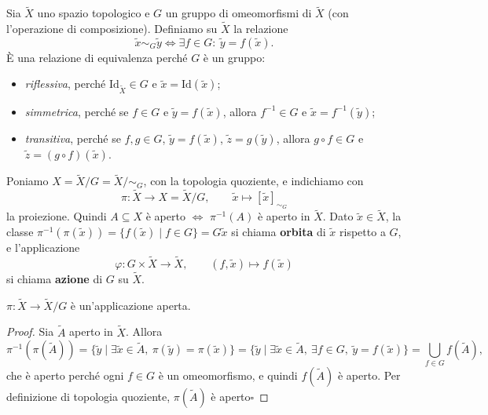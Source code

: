 Sia $\widetilde{X}$ uno spazio topologico e $G$ un gruppo di omeomorfismi di $\widetilde{X}$ (con l'operazione di composizione). Definiamo su $\widetilde{X}$ la relazione
\[
\widetilde{x} \sim_G \widetilde{y} \iff \exists f \in G : \ \widetilde{y} = f(\widetilde{x}).
\]
\`E una relazione di equivalenza perch\'e $G$ \`e un gruppo:
\begin{itemize}
    \item \emph{riflessiva}, perch\'e $\mathrm{Id}_{\widetilde{X}} \in G$ e $\widetilde{x} = \mathrm{Id}(\widetilde{x})$;
    \item \emph{simmetrica}, perch\'e se $f \in G$ e $\widetilde{y} = f(\widetilde{x})$, allora $f^{-1} \in G$ e $\widetilde{x} = f^{-1}(\widetilde{y})$;
    \item \emph{transitiva}, perch\'e se $f, g \in G$, $\widetilde{y} = f(\widetilde{x})$, $\widetilde{z} = g(\widetilde{y})$, allora $g \circ f \in G$ e $\widetilde{z} = (g \circ f)(\widetilde{x})$.
\end{itemize}
Poniamo $X = \widetilde{X}/G = \widetilde{X}/\!\sim_G$, con la topologia quoziente, e indichiamo con
\[
\pi: \widetilde{X} \to X = \widetilde{X}/G, \qquad \widetilde{x} \mapsto [\widetilde{x}]_{\sim_G}
\]
la proiezione. Quindi $A \subseteq X$ \`e aperto $\iff$ $\pi^{-1}(A)$ \`e aperto in $\widetilde{X}$.
Dato $\widetilde{x} \in \widetilde{X}$, la classe $\pi^{-1}(\pi(\widetilde{x})) = \{ f(\widetilde{x}) \mid f \in G \} = G\widetilde{x}$ si chiama \textbf{orbita} di $\widetilde{x}$ rispetto a $G$, e l'applicazione
\[
\varphi: G \times \widetilde{X} \to \widetilde{X}, \qquad (f, \widetilde{x}) \mapsto f(\widetilde{x})
\]
si chiama \textbf{azione} di $G$ su $\widetilde{X}$.

\begin{prop}
$\pi: \widetilde{X} \to \widetilde{X}/G$ \`e un'applicazione aperta.
\end{prop}
\begin{proof}
Sia $\widetilde{A}$ aperto in $\widetilde{X}$. Allora
\[
\pi^{-1}(\pi(\widetilde{A})) = \{ \widetilde{y} \mid \exists \widetilde{x} \in \widetilde{A},\ \pi(\widetilde{y}) = \pi(\widetilde{x}) \} = \{ \widetilde{y} \mid \exists \widetilde{x} \in \widetilde{A},\ \exists f \in G,\ \widetilde{y} = f(\widetilde{x}) \} = \bigcup_{f \in G} f(\widetilde{A}),
\]
che \`e aperto perch\'e ogni $f \in G$ \`e un omeomorfismo, e quindi $f(\widetilde{A})$ \`e aperto. Per definizione di topologia quoziente, $\pi(\widetilde{A})$ \`e aperto\hfill$\square$
\end{proof}


